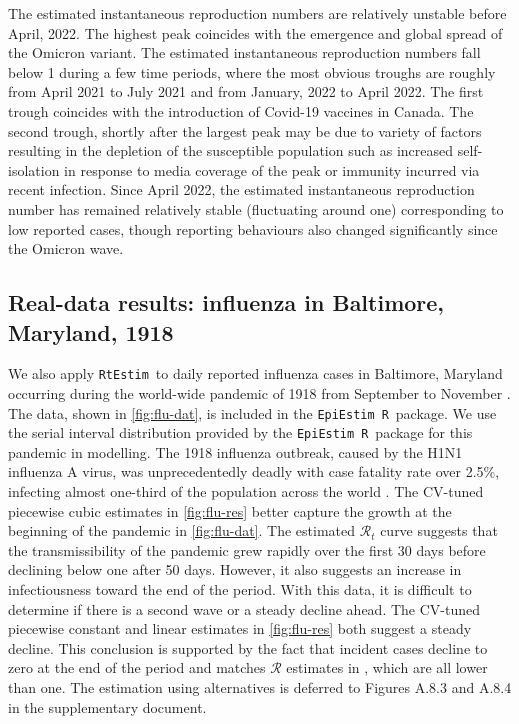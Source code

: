 \documentclass[10pt,letterpaper]{article}
\newcommand{\R}{\texttt{R}}
\def\RtEstim{\texttt{RtEstim}}
\def\EpiEstim{\texttt{EpiEstim}}
\def\calR{\mathcal{R}}
\begin{document}
The estimated instantaneous reproduction numbers are relatively unstable before April,
2022. The highest peak coincides with the emergence and global spread of the
Omicron variant. The estimated instantaneous reproduction numbers fall below 1 during 
a few time periods, where the most obvious troughs are roughly from April 2021 to July 2021 and from January,
2022 to April 2022. The first trough coincides with the introduction of
Covid-19 vaccines in Canada. The second trough, shortly after the
largest peak may be due to variety of factors resulting in the depletion of the
susceptible population such as increased self-isolation in response to media
coverage of the peak or immunity incurred via recent infection. Since April
2022, the estimated instantaneous reproduction number has remained relatively stable
(fluctuating around one) corresponding to low reported cases, though reporting
behaviours also changed significantly since the Omicron wave. 


\subsection{Real-data results: influenza in Baltimore, Maryland, 1918}

We also apply \RtEstim\ to daily reported influenza cases in Baltimore, Maryland
occurring during the world-wide pandemic of 1918 from September to November 
\cite{frost1919influenza}. The
data, shown in \autoref{fig:flu-dat}, is included in the \EpiEstim\ \R\ package.
We use the serial interval distribution provided by the \EpiEstim\ \R\ package for
this pandemic in modelling. 
The 1918 influenza outbreak, caused by the H1N1 influenza A virus, was
unprecedentedly deadly with case fatality rate over 2.5\%, infecting almost
one-third of the population across the world \cite{taubenberger20061918}. The
CV-tuned piecewise cubic estimates in \autoref{fig:flu-res} better capture the
growth at the beginning of the pandemic in \autoref{fig:flu-dat}. The estimated
$\calR_t$ curve suggests that the transmissibility of the pandemic grew rapidly
over the first 30 days before declining below one after 50 days. However, it
also suggests an increase in infectiousness toward the end of the period. With
this data, it is difficult to determine if there is a second wave or a steady
decline ahead. The CV-tuned piecewise constant and linear estimates in
\autoref{fig:flu-res} both suggest a steady decline. This conclusion is
supported by the fact that incident cases decline to zero at the end of the
period and matches $\calR$ estimates in \cite{cori2013new}, which are all lower
than one.
The estimation using alternatives is deferred to Figures A.8.3 and A.8.4 
in the supplementary document.
\end{document}
